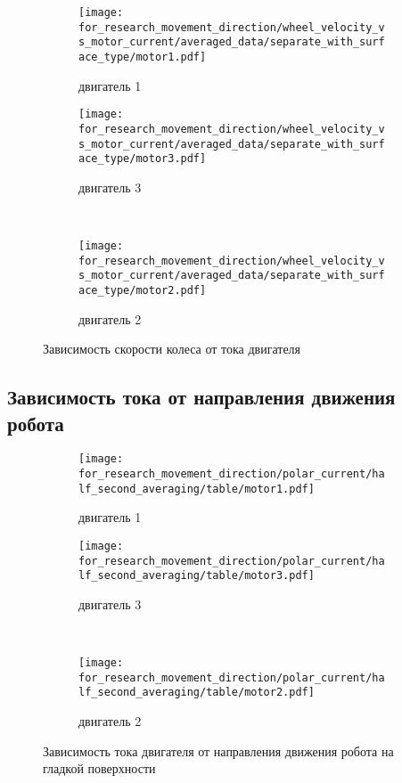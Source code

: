 \begin{figure}[H]
    \centering
    \begin{subfigure}{0.45\textwidth}
        \centering
        \texttt{[image: for\_research\_movement\_direction/wheel\_velocity\_vs\_motor\_current/averaged\_data/separate\_with\_surface\_type/motor1.pdf]}
        \caption{двигатель 1}
    \end{subfigure}
    \hspace{0.005\textwidth}
    \begin{subfigure}{0.45\textwidth}
        \centering
        \texttt{[image: for\_research\_movement\_direction/wheel\_velocity\_vs\_motor\_current/averaged\_data/separate\_with\_surface\_type/motor3.pdf]}
        \caption{двигатель 3}
    \end{subfigure} \\
    \vspace{4pt}
    \centering
    \begin{subfigure}{0.45\textwidth}
        \centering
        \texttt{[image: for\_research\_movement\_direction/wheel\_velocity\_vs\_motor\_current/averaged\_data/separate\_with\_surface\_type/motor2.pdf]}
        \caption{двигатель 2}
    \end{subfigure}
    \caption{Зависимость скорости колеса от тока двигателя}
\end{figure}

\subsection{Зависимость тока от направления движения робота}

\begin{figure}[H]
    \centering
    \begin{subfigure}{0.45\textwidth}
        \centering
        \texttt{[image: for\_research\_movement\_direction/polar\_current/half\_second\_averaging/table/motor1.pdf]}
        \caption{двигатель 1}
    \end{subfigure}
    \hspace{0.005\textwidth}
    \begin{subfigure}{0.45\textwidth}
        \centering
        \texttt{[image: for\_research\_movement\_direction/polar\_current/half\_second\_averaging/table/motor3.pdf]}
        \caption{двигатель 3}
    \end{subfigure} \\
    \vspace{4pt}
    \centering
    \begin{subfigure}{0.45\textwidth}
        \centering
        \texttt{[image: for\_research\_movement\_direction/polar\_current/half\_second\_averaging/table/motor2.pdf]}
        \caption{двигатель 2}
    \end{subfigure}
    \caption{Зависимость тока двигателя от направления движения робота на гладкой поверхности}
\end{figure}

